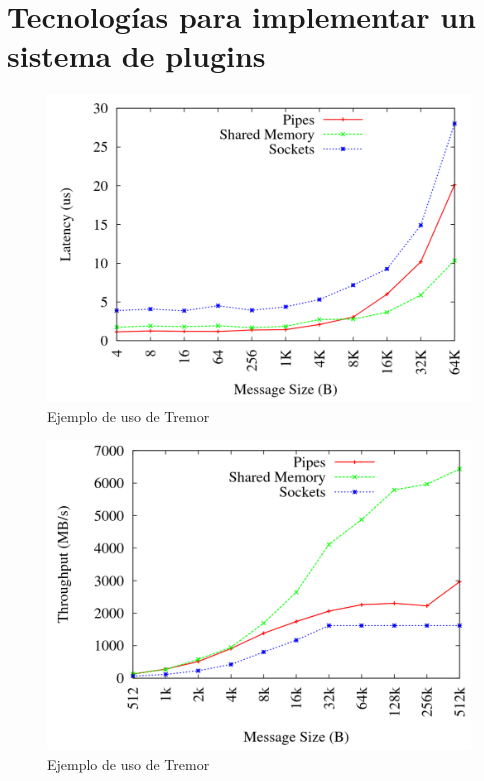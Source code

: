
\chapter{Tecnologías para implementar un sistema de plugins}


\begin{figure}
    \centering
    \includegraphics[width=\textwidth]{./Imagenes/venkataraman2015evaluation1.png}
    \caption{Ejemplo de uso de Tremor}%
    \label{fig:ipc_comparison1}
\end{figure}

\begin{figure}
    \centering
    \includegraphics[width=\textwidth]{./Imagenes/venkataraman2015evaluation2.png}
    \caption{Ejemplo de uso de Tremor}%
    \label{fig:ipc_comparison2}
\end{figure}

